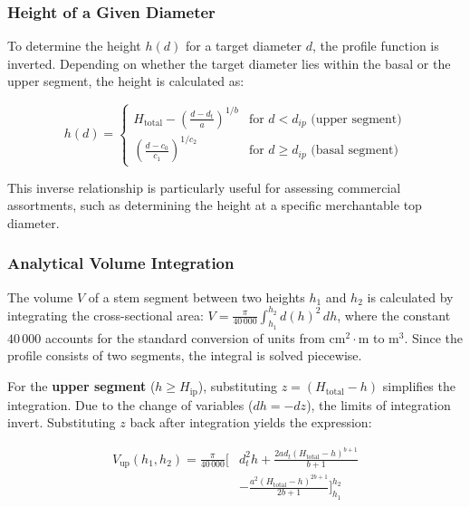 \documentclass[twocolumn, bibliography=totoc]{scrartcl}
\begin{document}
\subsubsection{Height of a Given Diameter}

To determine the height $h(d)$ for a target diameter $d$, the profile function is inverted. Depending on whether the target diameter lies within the basal or the upper segment, the height is calculated as:

\begin{equation}
  \label{eq:height_at_diameter}
h(d) = 
\begin{cases} 
H_{\text{total}} - \left( \frac{d - d_t}{a} \right)^{1/b} & \text{for } d < d_{ip} \text{ (upper segment)} \\
\left( \frac{d - c_0}{c_1} \right)^{1/c_2} & \text{for } d \ge d_{ip} \text{ (basal segment)} 
\end{cases}
\end{equation}

This inverse relationship is particularly useful for assessing commercial assortments, such as determining the height at a specific merchantable top diameter.

\subsubsection{Analytical Volume Integration}

The volume $V$ of a stem segment between two heights $h_1$ and $h_2$ is calculated by integrating the cross-sectional area: $V = \frac{\pi}{40\,000} \int_{h_1}^{h_2} d(h)^2 \, dh$, where the constant $40\,000$ accounts for the standard conversion of units from cm$^2\cdot$m to m$^3$. Since the profile consists of two segments, the integral is solved piecewise.

For the \textbf{upper segment} ($h \ge H_{\text{ip}}$), substituting $z = (H_{\text{total}}-h)$ simplifies the integration. Due to the change of variables ($dh = -dz$), the limits of integration invert. Substituting $z$ back after integration yields the expression:

\begin{equation}
\begin{aligned}
V_{\text{up}}(h_1, h_2) = \frac{\pi}{40\,000} \Bigg[ & d_t^2 h + \frac{2 a d_t (H_{\text{total}}-h)^{b+1}}{b+1} \\
& - \frac{a^2 (H_{\text{total}}-h)^{2b+1}}{2b+1} \Bigg]_{h_1}^{h_2}
\end{aligned}
\end{equation}
\end{document}
